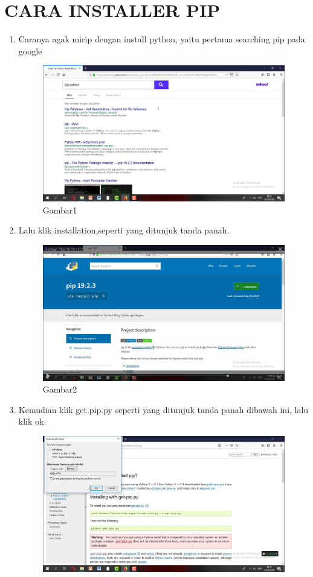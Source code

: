 \section{CARA INSTALLER PIP}
\begin{enumerate}
\item Caranya agak mirip dengan install python, yaitu pertama searching pip pada google
\begin{figure}[h]
    \centering
    \includegraphics[scale=0.2]{gambar/pip1.png}
    \caption{Gambar1}
    \label{fig:my_label}
\end{figure}
\item Lalu klik installation,seperti yang ditunjuk tanda panah.
\begin{figure}[h]
    \centering
    \includegraphics[scale=0.2]{gambar/pip2.png}
    \caption{Gambar2}
    \label{fig:my_label}
\end{figure}
\item Kemudian klik get.pip.py seperti yang ditunjuk tanda panah dibawah ini, lalu klik ok.
\begin{figure}[h]
    \centering
    \includegraphics[scale=0.2]{gambar/pip3.png}

\end{figure}
\end{enumerate}
